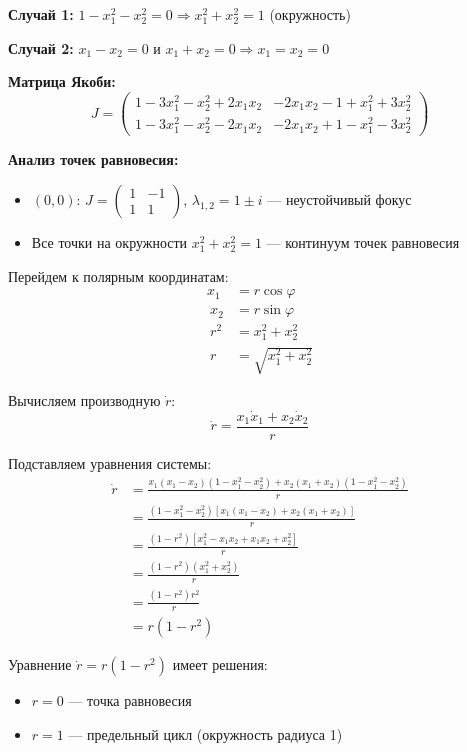 \textbf{Случай 1:} $1 - x_1^2 - x_2^2 = 0 \Rightarrow x_1^2 + x_2^2 = 1$ (окружность)

\textbf{Случай 2:} $x_1 - x_2 = 0$ и $x_1 + x_2 = 0 \Rightarrow x_1 = x_2 = 0$

\textbf{Матрица Якоби:}
$$J = \begin{pmatrix} 1-3x_1^2-x_2^2+2x_1x_2 & -2x_1x_2-1+x_1^2+3x_2^2 \\ 1-3x_1^2-x_2^2-2x_1x_2 & -2x_1x_2+1-x_1^2-3x_2^2 \end{pmatrix}$$

\textbf{Анализ точек равновесия:}
\begin{itemize}
\item $(0, 0)$: $J = \begin{pmatrix} 1 & -1 \\ 1 & 1 \end{pmatrix}$, $\lambda_{1,2} = 1 \pm i$ --- неустойчивый фокус
\item Все точки на окружности $x_1^2 + x_2^2 = 1$ --- континуум точек равновесия
\end{itemize}

Перейдем к полярным координатам:
\begin{align}
x_1 &= r\cos\varphi \\\
x_2 &= r\sin\varphi \\\
r^2 &= x_1^2 + x_2^2 \\\
r &= \sqrt{x_1^2 + x_2^2}
\end{align}

Вычисляем производную $\dot{r}$:
$$\dot{r} = \frac{x_1\dot{x}_1 + x_2\dot{x}_2}{r}$$

Подставляем уравнения системы:
\begin{align}
\dot{r} &= \frac{x_1(x_1 - x_2)(1 - x_1^2 - x_2^2) + x_2(x_1 + x_2)(1 - x_1^2 - x_2^2)}{r} \\\
&= \frac{(1 - x_1^2 - x_2^2)[x_1(x_1 - x_2) + x_2(x_1 + x_2)]}{r} \\\
&= \frac{(1 - r^2)[x_1^2 - x_1x_2 + x_1x_2 + x_2^2]}{r} \\\
&= \frac{(1 - r^2)(x_1^2 + x_2^2)}{r} \\\
&= \frac{(1 - r^2)r^2}{r} \\\
&= r(1 - r^2)
\end{align}

Уравнение $\dot{r} = r(1 - r^2)$ имеет решения:
\begin{itemize}
\item $r = 0$ --- точка равновесия
\item $r = 1$ --- предельный цикл (окружность радиуса 1)
\end{itemize}

